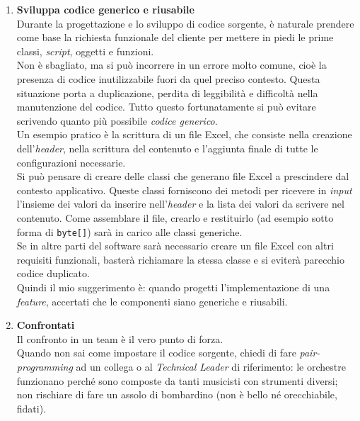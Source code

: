 \begin{enumerate}
\item \textbf{Sviluppa codice generico e riusabile} \\
Durante la progettazione e lo sviluppo di codice sorgente, è naturale prendere come base la richiesta funzionale del cliente per mettere in piedi le prime classi, \emph{script}, oggetti e funzioni. \\
Non è sbagliato, ma si può incorrere in un errore molto comune, cioè la presenza di codice inutilizzabile fuori da quel preciso contesto. Questa situazione porta a duplicazione, perdita di leggibilità e difficoltà nella manutenzione del codice. Tutto questo fortunatamente si può evitare scrivendo quanto più possibile \emph{codice generico}. \\
Un esempio pratico è la scrittura di un file Excel, che consiste nella creazione dell’\emph{header}, nella scrittura del contenuto e l’aggiunta finale di tutte le configurazioni necessarie. \\
Si può pensare di creare delle classi che generano file Excel a prescindere dal contesto applicativo. Queste classi forniscono dei metodi per ricevere in \emph{input} l’insieme dei valori da inserire nell’\emph{header} e la lista dei valori da scrivere nel contenuto. Come assemblare il file, crearlo e restituirlo (ad esempio sotto forma di \texttt{byte[]}) sarà in carico alle classi generiche. \\
Se in altre parti del software sarà necessario creare un file Excel con altri requisiti funzionali, basterà richiamare la stessa classe e si eviterà parecchio codice duplicato. \\
Quindi il mio suggerimento è: quando progetti l’implementazione di una \emph{feature}, accertati che le componenti siano generiche e riusabili.

\item \textbf{Confrontati} \\
Il confronto in un team è il vero punto di forza. \\
Quando non sai come impostare il codice sorgente, chiedi di fare \emph{pair-programming} ad un collega o al \emph{Technical Leader} di riferimento: le orchestre funzionano perché sono composte da tanti musicisti con strumenti diversi; non rischiare di fare un assolo di bombardino (non è bello né orecchiabile, fidati).


\end{enumerate}
